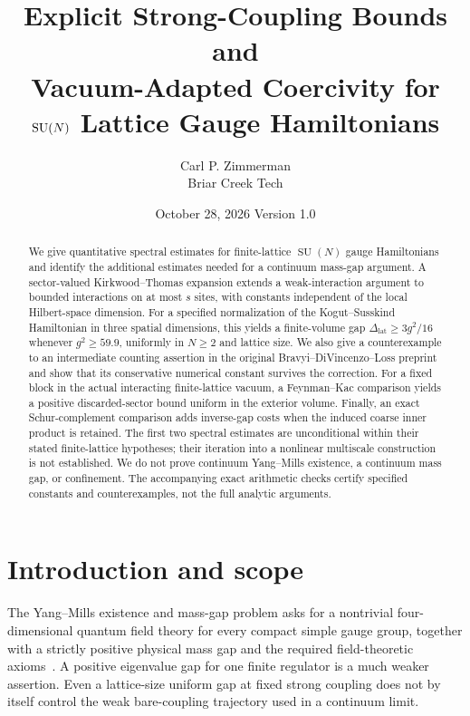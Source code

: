 \documentclass[11pt]{article}
\title{Explicit Strong-Coupling Bounds and\\
Vacuum-Adapted Coercivity for\\
$\SU(N)$ Lattice Gauge Hamiltonians}
\author{Carl P. Zimmerman\\[2pt]\small Briar Creek Tech}
\date{October 28, 2026 \quad Version 1.0}
\theoremstyle{definition}
\theoremstyle{remark}
\DeclareMathOperator{\SU}{SU}
\numberwithin{equation}{section}
\begin{document}
\maketitle
\begin{abstract}
We give quantitative spectral estimates for finite-lattice $\SU(N)$
gauge Hamiltonians and identify the additional estimates needed for a
continuum mass-gap argument. A sector-valued Kirkwood--Thomas expansion
extends a weak-interaction argument to bounded interactions on at most
$s$ sites, with constants independent of the local Hilbert-space dimension.
For a specified normalization of the Kogut--Susskind Hamiltonian in three
spatial dimensions, this yields a finite-volume gap
$\Delta_{\mathrm{lat}}\ge 3g^2/16$ whenever $g^2\ge59.9$, uniformly in
$N\ge2$ and lattice size. We also give a counterexample to an intermediate
counting assertion in the original Bravyi--DiVincenzo--Loss preprint and
show that its conservative numerical constant survives the correction.
For a fixed block in the actual interacting finite-lattice vacuum, a
Feynman--Kac comparison yields a positive discarded-sector bound uniform
in the exterior volume. Finally, an exact Schur-complement comparison
adds inverse-gap costs when the induced coarse inner product is retained.
The first two spectral estimates are unconditional within their stated
finite-lattice hypotheses; their iteration into a nonlinear multiscale
construction is not established. We do not prove continuum Yang--Mills
existence, a continuum mass gap, or confinement. The accompanying exact
arithmetic checks certify specified constants and counterexamples, not
the full analytic arguments.
\end{abstract}

\section{Introduction and scope}\label{sec:introduction}

The Yang--Mills existence and mass-gap problem asks for a nontrivial
four-dimensional quantum field theory for every compact simple gauge
group, together with a strictly positive physical mass gap and the
required field-theoretic axioms~\cite{JW}. A positive eigenvalue gap for
one finite regulator is a much weaker assertion. Even a lattice-size
uniform gap at fixed strong coupling does not by itself control the
weak bare-coupling trajectory used in a continuum limit.
\end{document}
